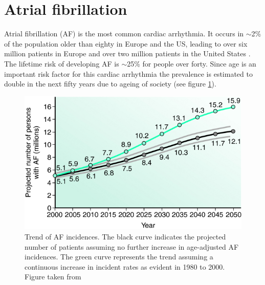 \newpage

\section{Atrial fibrillation}

Atrial fibrillation (AF) is the most common cardiac arrhythmia. It occurs in $\sim$2\% of the population older than eighty in Europe 
and the US, leading to over six million patients in Europe \cite{ESC10} and over two million patients in the United States \cite{CE09}. The 
lifetime risk of developing AF is $\sim$25\% for people over forty. Since age is an important risk factor for this cardiac arrhythmia the 
prevalence is estimated to double in the next fifty years due to ageing of society (see figure \ref{USincidences}).\newline

\begin{figure}[H]
\begin{center}
\includegraphics[scale=3]{./teile/introduction/af_incidences_us.png}
\caption{Trend of AF incidences. The black curve indicates the projected number of patients assuming no further increase in age-adjusted AF 
incidences. The green curve represents the trend assuming a continuous increase in incident rates as evident in 1980 to 2000. Figure taken 
from \cite{Miy06}}
\label{USincidences}
\end{center}
\end{figure}


